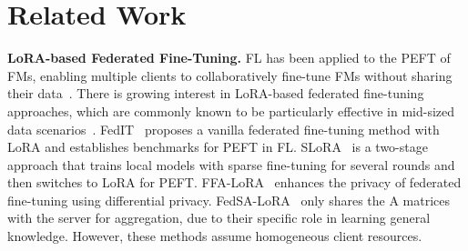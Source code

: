 \documentclass[sigconf]{acmart}
\begin{document}
\section{Related Work}\label{relatedwork}

\textbf{LoRA-based Federated Fine-Tuning.} FL has been applied to the PEFT of FMs, enabling multiple clients to collaboratively fine-tune FMs without sharing their data~\cite{zhang2023towards,babakniya2023slora,sun2024improving}.
There is growing interest in LoRA-based federated fine-tuning approaches, which are commonly known to be particularly effective in mid-sized data scenarios~\cite{hu2021lora}. 
FedIT~\cite{zhang2023towards} proposes a vanilla federated fine-tuning method with LoRA and establishes benchmarks for PEFT in FL. SLoRA~\cite{babakniya2023slora} is a two-stage approach that trains local models with sparse fine-tuning for several rounds and then switches to LoRA for PEFT. FFA-LoRA~\cite{sun2024improving} enhances the privacy of federated fine-tuning using differential privacy. {FedSA-LoRA}~\cite{guo2024selective} only shares the A matrices with the server for aggregation, due to their specific role in learning general knowledge. However, these methods assume homogeneous client resources.
\end{document}
